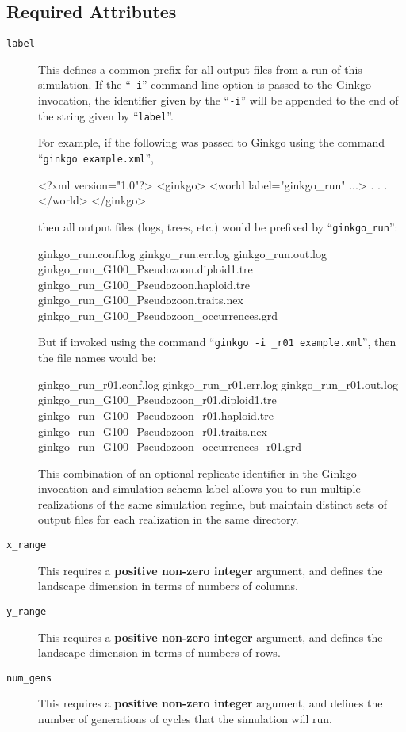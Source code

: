 \documentclass[11pt]{article}
\newcommand{\xmlattr}[1]{{\tt\textcolor{xmlattr}{#1}}}
\begin{document}
\subsection{Required Attributes}
\begin{description}

	\item[\xmlattr{label}] This defines a common prefix for all output files from a run of this simulation. If the ``\verb=-i='' command-line option is passed to the Ginkgo invocation, the identifier given by the ``\verb=-i='' will be appended to the end of the string given by ``\verb=label=''.
	
	For example, if the following was passed to Ginkgo using the command ``\verb=ginkgo example.xml='',

	\begin{ginkgoxml}
<?xml version="1.0"?>
<ginkgo>
    <world label="ginkgo_run" ...> 
	.
	.
	.	           
    </world>
</ginkgo>	
	\end{ginkgoxml}

then all output files (logs, trees, etc.) would be prefixed by ``\verb=ginkgo_run='':

\begin{shell}
ginkgo_run.conf.log
ginkgo_run.err.log
ginkgo_run.out.log
ginkgo_run_G100_Pseudozoon.diploid1.tre
ginkgo_run_G100_Pseudozoon.haploid.tre
ginkgo_run_G100_Pseudozoon.traits.nex
ginkgo_run_G100_Pseudozoon_occurrences.grd
\end{shell}

But if invoked using the command ``\verb=ginkgo -i _r01 example.xml='', then the file names would be:

\begin{shell}
ginkgo_run_r01.conf.log
ginkgo_run_r01.err.log
ginkgo_run_r01.out.log
ginkgo_run_G100_Pseudozoon_r01.diploid1.tre
ginkgo_run_G100_Pseudozoon_r01.haploid.tre
ginkgo_run_G100_Pseudozoon_r01.traits.nex
ginkgo_run_G100_Pseudozoon_occurrences_r01.grd	
\end{shell}

This combination of an optional replicate identifier in the Ginkgo invocation and simulation schema label allows you to run multiple realizations of the same simulation regime, but maintain distinct sets of output files for each realization in the same directory.

	\item[\xmlattr{x\_range}] This requires a \textbf{positive non-zero integer} argument, and defines the landscape dimension in terms of numbers of columns.

	\item[\xmlattr{y\_range}] This requires a \textbf{positive non-zero integer} argument, and defines the landscape dimension in terms of numbers of rows.
	
	\item[\xmlattr{num\_gens}] This requires a \textbf{positive non-zero integer} argument, and defines the number of generations of cycles that the simulation will run.	
		
\end{description}
\end{document}
